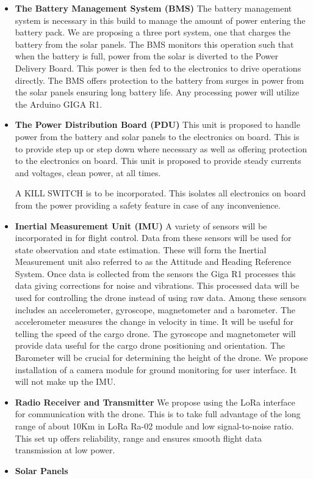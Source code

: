 \begin{itemize}
    \item \textbf{The Battery Management System (BMS)}
    The battery management system is necessary in this build to manage the amount of power entering the battery pack. We are proposing a three port system, one that charges the battery from the solar panels. The BMS monitors this operation such that when the battery is full, power from the solar is diverted to the Power Delivery Board. This power is then fed to the electronics to drive operations directly. The BMS offers protection to the battery from surges in power from the solar panels ensuring long battery life. Any processing power will utilize the Arduino GIGA R1.

    \item \textbf{The Power Distribution Board (PDU)}
    This unit is proposed to handle power from the battery and solar panels to the electronics on board. This is to provide step up or step down where necessary as well as offering protection to the electronics on board. This unit is proposed to provide steady currents and voltages, clean power, at all times.
    
    A KILL SWITCH is to be incorporated. This isolates all electronics on board from the power providing a safety feature in case of any inconvenience.

    \item \textbf{Inertial Measurement Unit (IMU)}
    A variety of sensors will be incorporated in for flight control. Data from these sensors will be used for state observation and state estimation. These will form the Inertial Measurement unit also referred to as the Attitude and Heading Reference System. Once data is collected from the sensors the Giga R1 processes this data giving corrections for noise and vibrations. This processed data will be used for controlling the drone instead of using raw data. Among these sensors includes an accelerometer, gyroscope, magnetometer and a barometer. The accelerometer measures the change in velocity in time. It will be useful for telling the speed of the cargo drone. The gyroscope and magnetometer will provide data useful for the cargo drone positioning and orientation. The Barometer will be crucial for determining the height of the drone. We propose installation of a camera module for ground monitoring for user interface. It will not make up the IMU.

    \item \textbf{Radio Receiver and Transmitter}
    We propose using the LoRa interface for communication with the drone. This is to take full advantage of the long range of about 10Km in LoRa Ra-02 module and low signal-to-noise ratio. This set up offers reliability, range and ensures smooth flight data transmission at low power.

    \item \textbf{Solar Panels}
\end{itemize}
